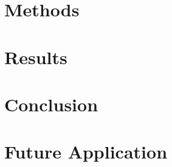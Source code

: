 \documentclass[12pt]{report}
\begin{document}
	\section{Methods}
		
		
		
	\section{Results}
		
		
				
	\section{Conclusion}
		
		
		
	\section{Future Application}
		
	
	{}
	
\end{document}

